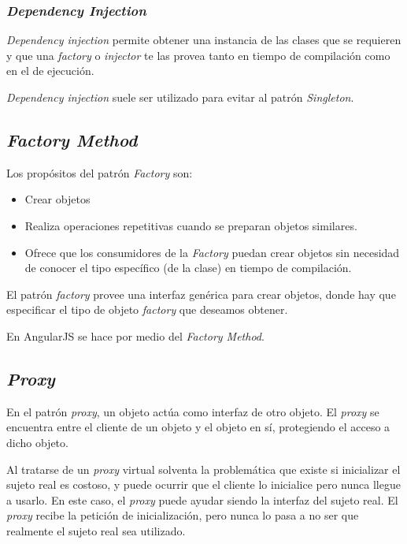\subsubsection{\textit{Dependency Injection}}
\textit{Dependency injection} permite obtener una instancia de las clases que se requieren y que una \textit{factory} o \textit{injector} te las provea tanto en tiempo de compilación como en el de ejecución\cite{depend_inject}.


\textit{Dependency injection} suele ser utilizado para evitar al patrón \textit{Singleton}\cite{mgechev}.


\subsection{\textit{Factory Method}}
Los propósitos del patrón \textit{Factory} son:


\begin{itemize}
\item Crear objetos
\item Realiza operaciones repetitivas cuando se preparan objetos similares.
\item Ofrece que los consumidores de la \textit{Factory} puedan crear objetos sin necesidad de conocer el tipo específico (de la clase) en tiempo de compilación\cite{stoyanstefanov2010}.
\end{itemize}


El patrón \textit{factory} provee una interfaz genérica para crear objetos, donde hay que especificar el tipo de objeto \textit{factory} que deseamos obtener\cite{addyosmani2012}.


En AngularJS se hace por medio del \textit{Factory Method}\cite{mgechev}.


\subsection{	\textit{Proxy}}
En el patrón \textit{proxy}, un objeto actúa como interfaz de otro objeto. El \textit{proxy} se encuentra entre el cliente de un objeto y el objeto en sí, protegiendo el acceso a dicho objeto.


Al tratarse de un \textit{proxy} virtual solventa la problemática que existe si inicializar el sujeto real es costoso, y puede ocurrir que el cliente lo inicialice pero nunca llegue a usarlo. En este caso, el \textit{proxy} puede ayudar siendo la interfaz del sujeto real. El \textit{proxy} recibe la petición de inicialización, pero nunca lo pasa a no ser que realmente el sujeto real sea utilizado. 



